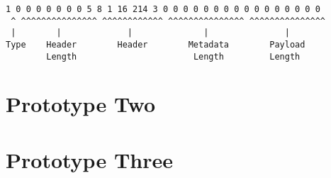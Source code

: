 \begin{lstlisting}[float,caption={Prototype One Example Packet Binary},label=p1d-example-binary]
 1 0 0 0 0 0 0 0 5 8 1 16 214 3 0 0 0 0 0 0 0 0 0 0 0 0 0 0 0 0
 ^ ^^^^^^^^^^^^^^^ ^^^^^^^^^^^^ ^^^^^^^^^^^^^^^ ^^^^^^^^^^^^^^^
 |        |             |              |               |
Type    Header        Header        Metadata        Payload
        Length                       Length         Length
\end{lstlisting}

\FloatBarrier

\section{Prototype Two}

\section{Prototype Three}
